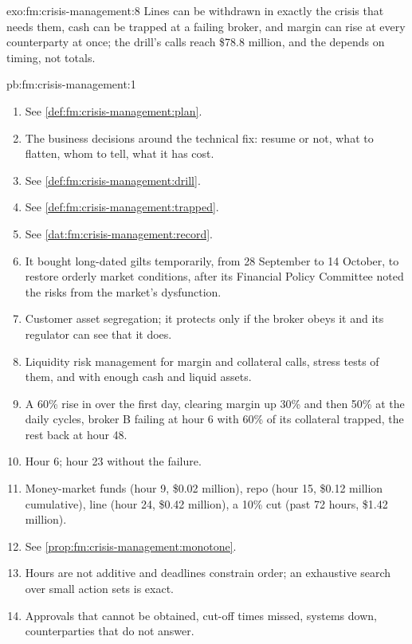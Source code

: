 \begin{solution}{exo:fm:crisis-management:8}
Lines can be withdrawn in exactly the crisis that needs them, cash can be trapped at a failing broker, and margin can rise at every counterparty at
once; the drill's calls reach \$78.8 million, and the  depends on timing, not totals.
\end{solution}

\begin{solution}{pb:fm:crisis-management:1}
\begin{enumerate}
\item See \cref{def:fm:crisis-management:plan}.
\item The business decisions around the technical fix: resume or not, what to flatten, whom to tell, what it has cost.
\item See \cref{def:fm:crisis-management:drill}.
\item See \cref{def:fm:crisis-management:trapped}.
\item See \cref{dat:fm:crisis-management:record}.
\item It bought long-dated gilts temporarily, from 28 September to 14 October, to restore orderly market conditions, after its Financial Policy
Committee noted the risks from the market's dysfunction.
\item Customer asset segregation; it protects only if the broker obeys it and its regulator can see that it does.
\item Liquidity risk management for margin and collateral calls, stress tests of them, and  with enough cash and liquid assets.
\item A 60\% rise in  over the first day, clearing margin up 30\% and then 50\% at the daily cycles, broker B failing at hour 6 with 60\% of
its collateral trapped, the rest back at hour 48.
\item Hour 6; hour 23 without the failure.
\item Money-market funds (hour 9, \$0.02 million), repo (hour 15, \$0.12 million cumulative), line (hour 24, \$0.42 million), a 10\% cut (past 72 hours,
\$1.42 million).
\item See \cref{prop:fm:crisis-management:monotone}.
\item Hours are not additive and deadlines constrain order; an exhaustive search over small action sets is exact.
\item Approvals that cannot be obtained, cut-off times missed, systems down, counterparties that do not answer.

\end{enumerate}
\end{solution}
